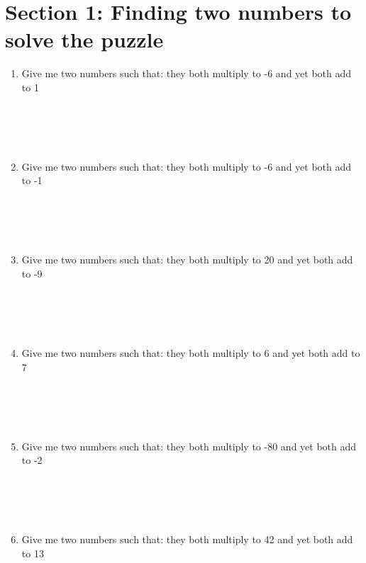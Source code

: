 \documentclass[12pt]{article}
\begin{document}
\section*{Section 1: Finding two numbers to solve the puzzle}
    \begin{enumerate}[\#1]
        \item Give me two numbers such that: 
        they both multiply to -6 and yet both add to 1
        \\\\\\\\\\
        \item Give me two numbers such that: 
        they both multiply to -6 and yet both add to -1
        \\\\\\\\\\
        \item Give me two numbers such that: 
        they both multiply to 20 and yet both add to -9
        \\\\\\\\\\
        \item Give me two numbers such that: 
        they both multiply to 6 and yet both add to 7
        \\\\\\\\\\
        \item Give me two numbers such that: 
        they both multiply to -80 and yet both add to -2
        \\\\\\\\\\
        \item Give me two numbers such that: 
        they both multiply to 42 and yet both add to 13

    \end{enumerate}
\vspace{4cm}
\end{document}
